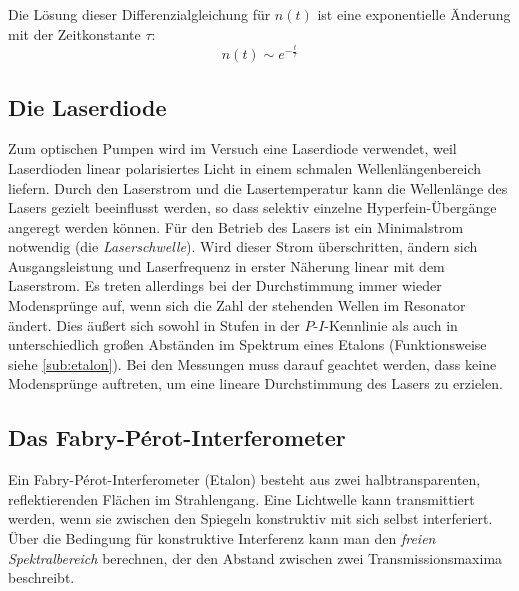 Die Lösung dieser Differenzialgleichung für $n(t)$ ist eine exponentielle Änderung mit der Zeitkonstante $\tau$:
\begin{equation}
    \label{eq:expabhorient}
    n(t) \sim e^{-\frac{t}{\tau}}
\end{equation}


\subsection{Die Laserdiode}
Zum optischen Pumpen wird im Versuch eine Laserdiode verwendet,
weil Laserdioden linear polarisiertes Licht in einem schmalen Wellenlängenbereich liefern.
Durch den Laserstrom und die Lasertemperatur kann die Wellenlänge des Lasers gezielt
beeinflusst werden, so dass selektiv einzelne Hyperfein-Übergänge angeregt werden können.
Für den Betrieb des Lasers ist ein Minimalstrom notwendig (die \emph{Laserschwelle}).
Wird dieser Strom überschritten, ändern sich Ausgangsleistung und Laserfrequenz
in erster Näherung linear mit dem Laserstrom.
Es treten allerdings bei der Durchstimmung immer wieder Modensprünge auf,
wenn sich die Zahl der stehenden Wellen im Resonator ändert. Dies äußert sich sowohl in Stufen in der $P$-$I$-Kennlinie 
als auch in unterschiedlich großen Abständen im Spektrum eines Etalons (Funktionsweise siehe \autoref{sub:etalon}).
Bei den Messungen muss darauf geachtet werden, dass keine Modensprünge auftreten,
um eine lineare Durchstimmung des Lasers zu erzielen.

\subsection{Das Fabry-Pérot-Interferometer}
\label{sub:etalon}
Ein Fabry-Pérot-Interferometer (Etalon) besteht aus zwei halbtransparenten, reflektierenden Flächen
im Strahlengang.
Eine Lichtwelle kann transmittiert werden, wenn sie zwischen den Spiegeln konstruktiv mit sich selbst interferiert.
Über die Bedingung für konstruktive Interferenz kann man den \emph{freien Spektralbereich} berechnen,
der den Abstand zwischen zwei Transmissionsmaxima beschreibt.
